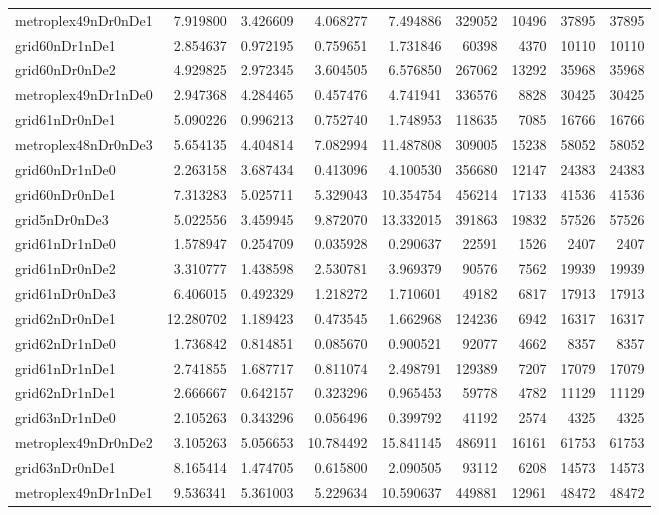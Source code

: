 \begin{longtable}{|l|r|r|r|r|r|r|r|r|}
metroplex49nDr0nDe1 & 7.919800 & 3.426609 & 4.068277 & 7.494886 & 329052 & 10496 & 37895 & 37895 \\
grid60nDr1nDe1 & 2.854637 & 0.972195 & 0.759651 & 1.731846 & 60398 & 4370 & 10110 & 10110 \\
grid60nDr0nDe2 & 4.929825 & 2.972345 & 3.604505 & 6.576850 & 267062 & 13292 & 35968 & 35968 \\
metroplex49nDr1nDe0 & 2.947368 & 4.284465 & 0.457476 & 4.741941 & 336576 & 8828 & 30425 & 30425 \\
grid61nDr0nDe1 & 5.090226 & 0.996213 & 0.752740 & 1.748953 & 118635 & 7085 & 16766 & 16766 \\
metroplex48nDr0nDe3 & 5.654135 & 4.404814 & 7.082994 & 11.487808 & 309005 & 15238 & 58052 & 58052 \\
grid60nDr1nDe0 & 2.263158 & 3.687434 & 0.413096 & 4.100530 & 356680 & 12147 & 24383 & 24383 \\
grid60nDr0nDe1 & 7.313283 & 5.025711 & 5.329043 & 10.354754 & 456214 & 17133 & 41536 & 41536 \\
grid5nDr0nDe3 & 5.022556 & 3.459945 & 9.872070 & 13.332015 & 391863 & 19832 & 57526 & 57526 \\
grid61nDr1nDe0 & 1.578947 & 0.254709 & 0.035928 & 0.290637 & 22591 & 1526 & 2407 & 2407 \\
grid61nDr0nDe2 & 3.310777 & 1.438598 & 2.530781 & 3.969379 & 90576 & 7562 & 19939 & 19939 \\
grid61nDr0nDe3 & 6.406015 & 0.492329 & 1.218272 & 1.710601 & 49182 & 6817 & 17913 & 17913 \\
grid62nDr0nDe1 & 12.280702 & 1.189423 & 0.473545 & 1.662968 & 124236 & 6942 & 16317 & 16317 \\
grid62nDr1nDe0 & 1.736842 & 0.814851 & 0.085670 & 0.900521 & 92077 & 4662 & 8357 & 8357 \\
grid61nDr1nDe1 & 2.741855 & 1.687717 & 0.811074 & 2.498791 & 129389 & 7207 & 17079 & 17079 \\
grid62nDr1nDe1 & 2.666667 & 0.642157 & 0.323296 & 0.965453 & 59778 & 4782 & 11129 & 11129 \\
grid63nDr1nDe0 & 2.105263 & 0.343296 & 0.056496 & 0.399792 & 41192 & 2574 & 4325 & 4325 \\
metroplex49nDr0nDe2 & 3.105263 & 5.056653 & 10.784492 & 15.841145 & 486911 & 16161 & 61753 & 61753 \\
grid63nDr0nDe1 & 8.165414 & 1.474705 & 0.615800 & 2.090505 & 93112 & 6208 & 14573 & 14573 \\
metroplex49nDr1nDe1 & 9.536341 & 5.361003 & 5.229634 & 10.590637 & 449881 & 12961 & 48472 & 48472 \\

\end{longtable}

